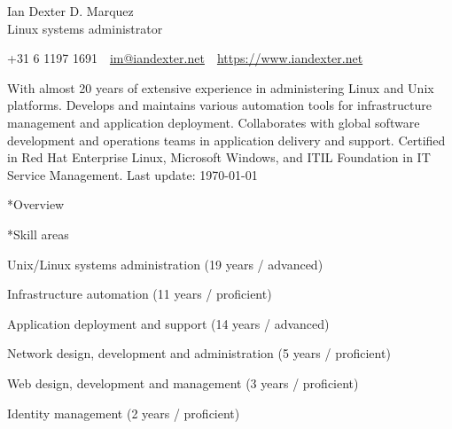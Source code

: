 \documentclass[10pt, a4paper, final]{article}
\begin{document}
\begin{center}
  \Huge Ian Dexter D. Marquez\\
  \Large Linux systems administrator
\end{center}

\begin{center}\begin{spacing}{1}\small
  +31 6 1197 1691~\textbullet~\href{mailto:im@iandexter.net}{im@iandexter.net}~\textbullet~\href{https://www.iandexter.net}{https://www.iandexter.net}\\
\end{spacing}\end{center}
\vspace{1.5em}

\normalsize With almost 20 years of extensive experience in administering Linux and Unix platforms. Develops and maintains various automation tools for infrastructure management and application deployment. Collaborates with global software development and operations teams in application delivery and support. Certified in Red Hat Enterprise Linux, Microsoft Windows, and ITIL Foundation in IT Service Management. \small \textcolor{dark-gray}{Last update: \textsc{\today}} \normalsize

\vspace{1em}

\begin{section}*{Overview}
  \begin{subsection}*{Skill areas}
    \begin{compactitem}
      \item Unix/Linux systems administration (19 years / advanced) 
      \item Infrastructure automation (11 years / proficient) 
      \item Application deployment and support (14 years / advanced) 
      \item Network design, development and administration (5 years / proficient) 
      \item Web design, development and management (3 years / proficient) 
      \item Identity management (2 years / proficient) 
    \end{compactitem}
  \end{subsection}
\end{section}

\vspace{1em}
\end{document}
